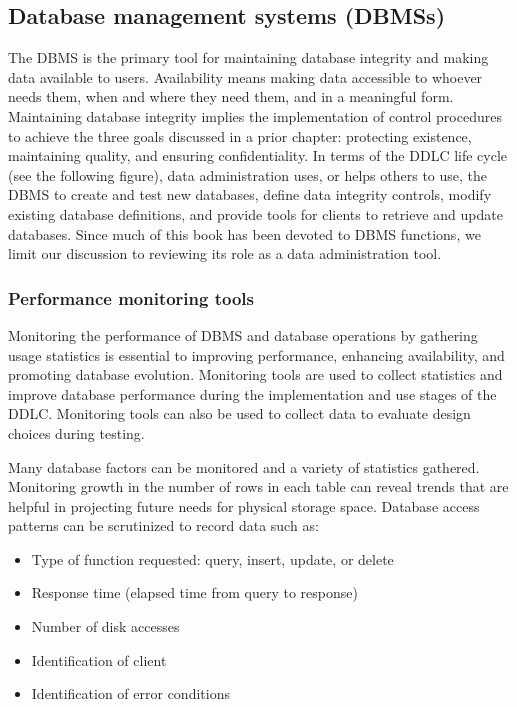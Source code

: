 \documentclass[
]{article}
\begin{document}
\hypertarget{database-management-systems-dbmss}{%
\subsection*{Database management systems (DBMSs)}\label{database-management-systems-dbmss}}

The DBMS is the primary tool for maintaining database integrity and
making data available to users. Availability means making data
accessible to whoever needs them, when and where they need them, and in
a meaningful form. Maintaining database integrity implies the
implementation of control procedures to achieve the three goals
discussed in a prior chapter: protecting existence, maintaining quality,
and ensuring confidentiality. In terms of the DDLC life cycle (see the
following figure), data administration uses, or helps others to use, the
DBMS to create and test new databases, define data integrity controls,
modify existing database definitions, and provide tools for clients to
retrieve and update databases. Since much of this book has been devoted
to DBMS functions, we limit our discussion to reviewing its role as a
data administration tool.

\hypertarget{performance-monitoring-tools}{%
\subsubsection*{Performance monitoring tools}\label{performance-monitoring-tools}}

Monitoring the performance of DBMS and database operations by gathering
usage statistics is essential to improving performance, enhancing
availability, and promoting database evolution. Monitoring tools are
used to collect statistics and improve database performance during the
implementation and use stages of the DDLC. Monitoring tools can also be
used to collect data to evaluate design choices during testing.

Many database factors can be monitored and a variety of statistics
gathered. Monitoring growth in the number of rows in each table can
reveal trends that are helpful in projecting future needs for physical
storage space. Database access patterns can be scrutinized to record
data such as:

\begin{itemize}
\item
  Type of function requested: query, insert, update, or delete
\item
  Response time (elapsed time from query to response)
\item
  Number of disk accesses
\item
  Identification of client
\item
  Identification of error conditions
\end{itemize}
\end{document}
